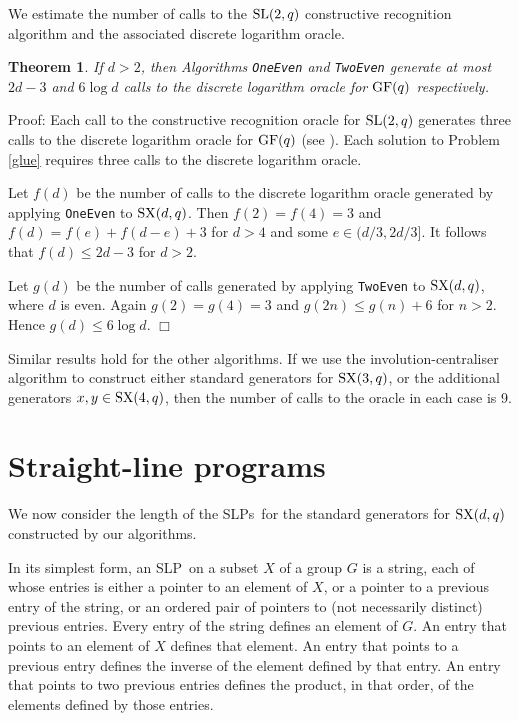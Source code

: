 \documentclass[12pt]{article}
\newtheorem{theorem}[definition]{Theorem}
\newenvironment{proof}{\normalsize {\sc Proof}:}{{\hfill $\Box$ \\}}
\def\SL{{\rm SL}}
\def\GF{{\rm GF}}
\def\SX{{\rm SX}}
\def\SLP{{\rm SLP}}
\def\SLPs{{\rm SLPs}}
\begin{document}
We estimate the number of calls to the $\SL(2, q)$ constructive
recognition algorithm and the associated discrete logarithm oracle.
\begin{theorem}\label{Theorem2} 
If $d > 2$, then Algorithms {\tt OneEven} and {\tt TwoEven}
generate at most $2d-3$ and $6 \log d$ calls  to 
the discrete logarithm oracle for $\GF(q)$ respectively.
\end{theorem}
\begin{proof}
Each call to the constructive recognition oracle for $\SL(2,q)$ generates 
three calls to the discrete logarithm oracle for $\GF(q)$ 
(see \cite{Conderetal05}).
Each solution to Problem \ref{glue} requires three calls to 
the discrete logarithm oracle. 

Let $f(d)$ be the number of calls to the discrete logarithm oracle 
generated by applying {\tt OneEven} to $\SX(d, q)$. 
Then $f(2) = f(4) = 3$ and 
$f(d) = f(e) + f(d - e) + 3$ for $d > 4$ and some $e \in (d/3, 2d/3]$.
It follows that $f(d) \leq 2d - 3$ for $d > 2$.

Let $g(d)$ be the number of calls generated by 
applying {\tt TwoEven} to $\SX(d, q)$, where $d$ is even.
Again $g(2) = g(4) = 3$ and $g(2n) \leq g(n) + 6$ for $n > 2$.
Hence $g(d) \leq 6 \log d$.
\end{proof}

Similar results hold for the other algorithms.
If we use the involution-centraliser algorithm \cite{Ryba-paper} 
to construct either standard generators for $\SX(3, q)$, 
or the additional generators $x, y \in \SX(4, q)$, 
then the number of calls to the oracle in each case is 9.

\section{Straight-line programs}\label{SLP}
We now consider the length of the \SLPs\ for the 
standard generators for $\SX(d, q)$ constructed by our algorithms.

In its simplest form, 
an \SLP\ on a subset $X$ of a group $G$ is a
string, each of whose entries is either a pointer to an element of $X$, 
or a pointer to a previous
entry of the string, or an ordered pair of pointers to (not necessarily 
distinct) previous entries.
Every entry of the string defines an element of $G$.  An 
entry that points to an element of
$X$ defines that element.  An entry that points to a previous entry defines 
the inverse of the element defined by that entry.  An entry that points to 
two previous entries defines the
product, in that order, of the elements defined by those entries.
\end{document}
